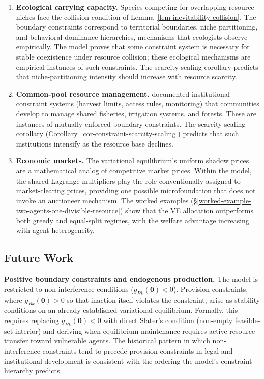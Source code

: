 \documentclass[11pt]{article}
\theoremstyle{plain}
\theoremstyle{definition}
\theoremstyle{remark}
\let\origsubsection\subsection
\renewcommand{\subsection}{\needspace{7\baselineskip}\origsubsection}
\begin{document}
\begin{enumerate}
\def\labelenumi{\arabic{enumi}.}
\item
  \textbf{Ecological carrying capacity.} Species competing for
  overlapping resource niches face the collision condition of
  Lemma~\ref{lem-inevitability-collision}. The boundary constraints
  correspond to territorial boundaries, niche partitioning, and
  behavioral dominance hierarchies, mechanisms that ecologists observe
  empirically. The model proves that some constraint system is necessary
  for stable coexistence under resource collision; these ecological
  mechanisms are empirical instances of such constraints. The
  scarcity-scaling corollary predicts that niche-partitioning intensity
  should increase with resource scarcity.
\item
  \textbf{Common-pool resource management.} \citet{Ostrom1990}
  documented institutional constraint systems (harvest limits, access
  rules, monitoring) that communities develop to manage shared
  fisheries, irrigation systems, and forests. These are instances of
  mutually enforced boundary constraints. The scarcity-scaling corollary
  (Corollary~\ref{cor-constraint-scarcity-scaling}) predicts that such
  institutions intensify as the resource base declines.
\item
  \textbf{Economic markets.} The variational equilibrium's uniform
  shadow prices are a mathematical analog of competitive market prices.
  Within the model, the shared Lagrange multipliers play the role
  conventionally assigned to market-clearing prices, providing one
  possible microfoundation that does not invoke an auctioneer mechanism.
  The worked examples
  (§\ref{worked-example-two-agents-one-divisible-resource}) show that
  the VE allocation outperforms both greedy and equal-split regimes,
  with the welfare advantage increasing with agent heterogeneity.
\end{enumerate}

\subsection{Future Work}\label{future-work}

\textbf{Positive boundary constraints and endogenous production.} The
model is restricted to non-interference conditions
(\(g_{Bk}(\mathbf{0}) < 0\)). Provision constraints, where
\(g_{Bk}(\mathbf{0}) > 0\) so that inaction itself violates the
constraint, arise as stability conditions on an already-established
variational equilibrium. Formally, this requires replacing
\(g_{Bk}(\mathbf{0}) < 0\) with direct Slater's condition (non-empty
feasible-set interior) and deriving when equilibrium maintenance
requires active resource transfer toward vulnerable agents. The
historical pattern in which non-interference constraints tend to precede
provision constraints in legal and institutional development is
consistent with the ordering the model's constraint hierarchy predicts.
\end{document}
